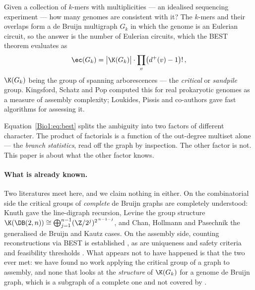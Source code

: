 Given a collection of $k$-mers with multiplicities --- an idealised sequencing experiment
--- how many genomes are consistent with it? The $k$-mers and their overlaps form a de
Bruijn multigraph $G_k$ in which the genome is an Eulerian circuit, so the answer is the
number of Eulerian circuits, which the BEST theorem \cite{AEdB,SmithTutte} evaluates as
\begin{equation}\label{Bio1:eq:best}
\ec(G_k)=\bigl|\K(G_k)\bigr|\cdot\prod_{v}\bigl(d^{+}(v)-1\bigr)!\,,
\end{equation}
$\K(G_k)$ being the group of spanning arborescences --- the \emph{critical} or
\emph{sandpile} group. Kingsford, Schatz and Pop \cite{KSP} computed this for real
prokaryotic genomes as a measure of assembly complexity; Loukides, Pissis and co-authors
\cite{Loukides} gave fast algorithms for assessing it.

Equation~\eqref{Bio1:eq:best} splits the ambiguity into two factors of different character. The
product of factorials is a function of the out-degree multiset alone --- the \emph{branch
statistics}, read off the graph by inspection. The other factor is not. This paper is
about what the other factor knows.

\paragraph{What is already known.}
Two literatures meet here, and we claim nothing in either. On the combinatorial side the
critical groups of \emph{complete} de Bruijn graphs are completely understood: Knuth
\cite{Knuth} gave the line-digraph recursion, Levine \cite{Levine} the group structure
$\K(\DB(2,n))\cong\bigoplus_{j=1}^{n-1}(\Z/2^{j})^{2^{\,n-1-j}}$, and Chan, Hollmann and
Pasechnik \cite{CHP} the generalised de Bruijn and Kautz cases. On the assembly side,
counting reconstructions via BEST is established \cite{KSP,Loukides}, as are uniqueness and
safety criteria \cite{ObscuraTomescu} and feasibility thresholds \cite{BBT,NagarajanPop}.
What appears not to have happened is that the two ever met: we have found no work applying
the critical group of a graph to assembly, and none that looks at the \emph{structure} of
$\K(G_k)$ for a genome de Bruijn graph, which is a subgraph of a complete one and not
covered by \cite{Levine,CHP}.

